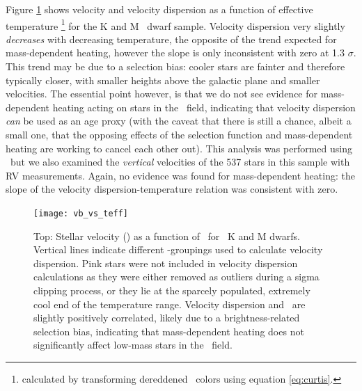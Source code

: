 Figure \ref{fig:vb_vs_teff} shows velocity and velocity dispersion as a
function of effective temperature \footnote{calculated by transforming
dereddened \gaia\ colors using equation \ref{eq:curtis}.} for the K and M
\kepler\ dwarf sample.
Velocity dispersion very slightly {\it decreases} with decreasing temperature,
the opposite of the trend expected for mass-dependent heating, however the
slope is only inconsistent with zero at 1.3 $\sigma$.
This trend may be due to a selection bias: cooler stars are fainter and
therefore typically closer, with smaller heights above the galactic plane and
smaller velocities.
The essential point however, is that we do not see evidence for mass-dependent
heating acting on stars in the \kepler\ field, indicating that velocity
dispersion {\it can} be used as an age proxy (with the caveat that there is
still a chance, albeit a small one, that the opposing effects of the selection
function and mass-dependent heating are working to cancel each other out).
This analysis was performed using \vb\ but we also examined the {\it vertical}
velocities of the 537 stars in this sample with RV measurements.
Again, no evidence was found for mass-dependent heating: the slope of the
velocity dispersion-temperature relation was consistent with zero.
\begin{figure}
  \caption{
      Top: Stellar velocity (\vb) as a function of \teff\ for
      \kepler\ K and M dwarfs.
Vertical lines indicate different \teff-groupings used to calculate velocity
    dispersion.
Pink stars were not included in velocity dispersion calculations as they were
    either removed as outliers during a sigma clipping process, or they lie at
    the sparcely populated, extremely cool end of the temperature range.
    Velocity dispersion and \teff\ are slightly positively correlated, likely
    due to a brightness-related selection bias, indicating that mass-dependent
    heating does not significantly affect low-mass stars in the \kepler\
    field.
}
  \centering
    \texttt{[image: vb\_vs\_teff]}
\label{fig:vb_vs_teff}
\end{figure}

